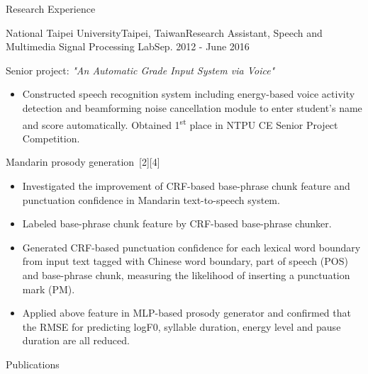 \documentclass{resume} %
\newcommand{\ts}{\textsuperscript}
\begin{document}
\begin{rSection}{Research Experience}
\begin{rSubsection}{National Taipei University}{Taipei, Taiwan}{Research Assistant, Speech and Multimedia Signal Processing Lab}{Sep. 2012 - June 2016}
        \item Senior project: {\em "An Automatic Grade Input System via Voice"}
        \begin{itemize}[label=$-$]
            \setlength \itemsep{-0.5em}
            \item Constructed speech recognition system including energy-based voice activity detection and beamforming noise cancellation module to enter student's name and score automatically. Obtained 1\ts{st} place in NTPU CE Senior Project Competition.
        \end{itemize}\vspace{0.5em}
        \item Mandarin prosody generation~[2][4]
        \begin{itemize}[label=$-$]
            \setlength \itemsep{-0.5em}
            \item Investigated the improvement of CRF-based base-phrase chunk feature and punctuation confidence in Mandarin text-to-speech system. 
            \item Labeled base-phrase chunk feature by CRF-based base-phrase chunker. 
            \item Generated CRF-based punctuation confidence for each lexical word boundary from input text tagged with Chinese word boundary, part of speech (POS) and base-phrase chunk, 
                  measuring the likelihood of inserting a punctuation mark (PM). 
            \item Applied above feature in MLP-based prosody generator and confirmed that the RMSE for predicting logF0, syllable duration, energy level and pause duration are all reduced.
        \end{itemize}\vspace{0.5em}
    \end{rSubsection}
\end{rSection}

\begin{rSection}{Publications}
    
    
    \begin{enumerate}[label={[\arabic*]}]
    \item {}
    \item {}
    \item {}
    \item {}
    \end{enumerate}    
\end{rSection}
\end{document}
